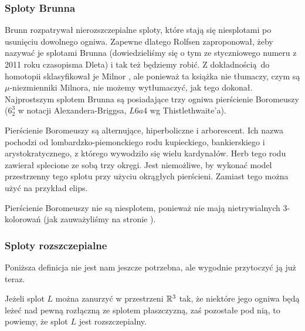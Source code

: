 \subsubsection{Sploty Brunna}
Brunn \cite{brunn1892} rozpatrywał nierozszczepialne sploty, które stają się niesplotami po usunięciu dowolnego ogniwa.
Zapewne dlatego Rolfsen zaproponował, żeby nazywać je splotami Brunna (dowiedzieliśmy się o tym ze styczniowego numeru z 2011 roku czasopisma Dleta) i tak też będziemy robić.
%
Z dokładnością do homotopii sklasyfikował je Milnor \cite{milnor1954}, ale ponieważ ta książka nie tłumaczy, czym są $\mu$-niezmienniki Milnora, nie możemy wytłumaczyć, jak tego dokonał.
%
Najprostszym splotem Brunna są posiadające trzy ogniwa pierścienie Boromeuszy ($6_2^3$ w notacji Alexandera-Briggsa, $L6a4$ wg Thistlethwaite'a).

Pierścienie Boromeuszy są alternujące, hiperboliczne i arborescent.
Ich nazwa pochodzi od lombardzko-piemonckiego rodu kupieckiego, bankierskiego i arystokratycznego, z którego wywodziło się wielu kardynałów.
Herb tego rodu zawierał splecione ze sobą trzy okręgi.
Jest niemożliwe, by wykonać model przestrzenny tego splotu przy użyciu okrągłych pierścieni.
Zamiast tego można użyć na przykład elips.

Pierścienie Boromeuszy nie są niesplotem, ponieważ nie mają nietrywialnych 3-kolorowań (jak zauważyliśmy na stronie \pageref{boromean_not_splittable}).

\subsubsection{Sploty rozszczepialne}

Poniższa definicja nie jest nam jeszcze potrzebna, ale wygodnie przytoczyć ją już teraz.

\begin{definition}[rozszczepialność]
%
    Jeżeli splot $L$ można zanurzyć w przestrzeni $\mathbb R^3$ tak, że niektóre jego ogniwa będą leżeć nad pewną rozłączną ze splotem płaszczyzną, zaś pozostałe pod nią, to powiemy, że splot $L$ jest rozszczepialny.
\end{definition}

